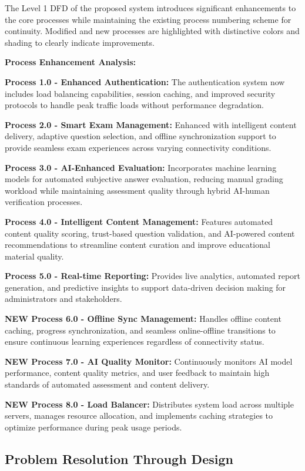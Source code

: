 \documentclass[12pt,a4paper,oneside]{book}
\begin{document}
The Level 1 DFD of the proposed system introduces significant enhancements to the core processes while maintaining the existing process numbering scheme for continuity. Modified and new processes are highlighted with distinctive colors and shading to clearly indicate improvements.



\textbf{Process Enhancement Analysis:}

\textbf{Process 1.0 - Enhanced Authentication:} The authentication system now includes load balancing capabilities, session caching, and improved security protocols to handle peak traffic loads without performance degradation.

\textbf{Process 2.0 - Smart Exam Management:} Enhanced with intelligent content delivery, adaptive question selection, and offline synchronization support to provide seamless exam experiences across varying connectivity conditions.

\textbf{Process 3.0 - AI-Enhanced Evaluation:} Incorporates machine learning models for automated subjective answer evaluation, reducing manual grading workload while maintaining assessment quality through hybrid AI-human verification processes.

\textbf{Process 4.0 - Intelligent Content Management:} Features automated content quality scoring, trust-based question validation, and AI-powered content recommendations to streamline content curation and improve educational material quality.

\textbf{Process 5.0 - Real-time Reporting:} Provides live analytics, automated report generation, and predictive insights to support data-driven decision making for administrators and stakeholders.

\textbf{NEW Process 6.0 - Offline Sync Management:} Handles offline content caching, progress synchronization, and seamless online-offline transitions to ensure continuous learning experiences regardless of connectivity status.

\textbf{NEW Process 7.0 - AI Quality Monitor:} Continuously monitors AI model performance, content quality metrics, and user feedback to maintain high standards of automated assessment and content delivery.

\textbf{NEW Process 8.0 - Load Balancer:} Distributes system load across multiple servers, manages resource allocation, and implements caching strategies to optimize performance during peak usage periods.

\subsection{Problem Resolution Through Design}
\end{document}
